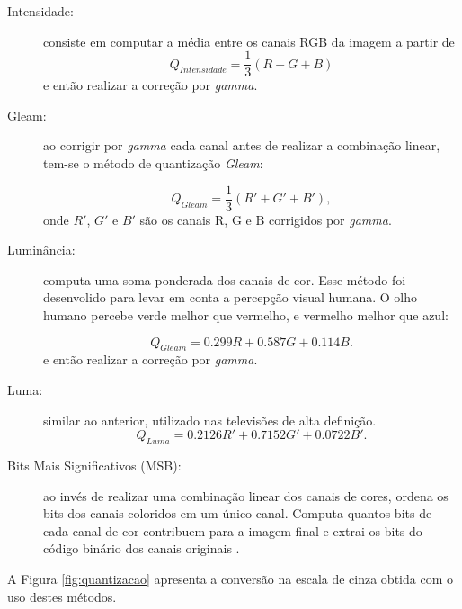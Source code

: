 \begin{description}
\item [Intensidade:] consiste em computar a média entre os canais RGB da imagem a partir de
\begin{equation*}
	Q_{Intensidade} = \frac{1}{3}(R + G + B)
\end{equation*}
\noindent e então realizar a correção por \textit{gamma}.

\item [Gleam:] ao corrigir por \textit{gamma} cada canal antes de realizar a combinação linear, tem-se o método de quantização \textit{Gleam}:

\begin{equation*}
	Q_{Gleam} = \frac{1}{3}(R' + G' + B'),
\end{equation*}
\noindent onde $R'$, $G'$ e $B'$ são os canais R, G e B corrigidos por \textit{gamma}.

\item [Luminância:] computa uma soma ponderada dos canais de cor. Esse método foi desenvolido para levar em conta a percepção visual humana. O olho humano percebe verde melhor que vermelho, e vermelho melhor que azul:

\begin{equation*}
	Q_{Gleam} = 0.299R + 0.587G + 0.114B.
\end{equation*}
\noindent e então realizar a correção por \textit{gamma}.

\item [Luma:]  similar ao anterior, utilizado nas televisões de alta definição.
\begin{equation*}
	Q_{Luma} = 0.2126R' + 0.7152G' + 0.0722B'.
\end{equation*}

\item [Bits Mais Significativos (MSB):] ao invés de realizar uma combinação linear dos canais de cores, ordena os bits dos canais coloridos em um único canal. Computa quantos bits de cada canal de cor contribuem para a imagem final e extrai os bits do código binário dos canais originais \cite{Ponti-Jr2013}.

\end{description}

A Figura \ref{fig:quantizacao} apresenta a conversão na escala de cinza obtida com o uso destes métodos.


